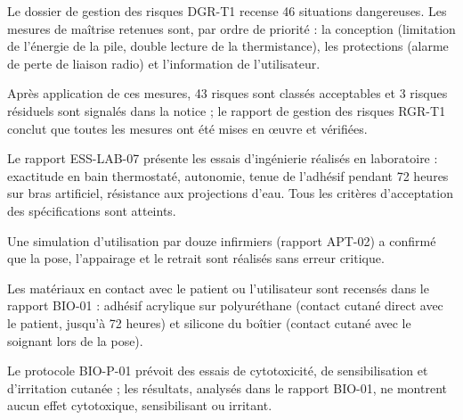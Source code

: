 \documentclass[11pt,a4paper]{article}
\begin{document}
{\small Le dossier de gestion des risques DGR-T1 recense 46 situations dangereuses. Les mesures de maîtrise retenues sont, par ordre de priorité : la conception (limitation de l'énergie de la pile, double lecture de la thermistance), les protections (alarme de perte de liaison radio) et l'information de l'utilisateur.}\par

{\small Après application de ces mesures, 43 risques sont classés acceptables et 3 risques résiduels sont signalés dans la notice ; le rapport de gestion des risques RGR-T1 conclut que toutes les mesures ont été mises en œuvre et vérifiées.}\par

\par{}\par

\par{}\par

{\small Le rapport ESS-LAB-07 présente les essais d'ingénierie réalisés en laboratoire : exactitude en bain thermostaté, autonomie, tenue de l'adhésif pendant 72 heures sur bras artificiel, résistance aux projections d'eau. Tous les critères d'acceptation des spécifications sont atteints.}\par

{\small Une simulation d'utilisation par douze infirmiers (rapport APT-02) a confirmé que la pose, l'appairage et le retrait sont réalisés sans erreur critique.}\par

\par{}\par

{\small Les matériaux en contact avec le patient ou l'utilisateur sont recensés dans le rapport BIO-01 : adhésif acrylique sur polyuréthane (contact cutané direct avec le patient, jusqu'à 72 heures) et silicone du boîtier (contact cutané avec le soignant lors de la pose).}\par

{\small Le protocole BIO-P-01 prévoit des essais de cytotoxicité, de sensibilisation et d'irritation cutanée ; les résultats, analysés dans le rapport BIO-01, ne montrent aucun effet cytotoxique, sensibilisant ou irritant.}\par

\par{}\par
\end{document}

